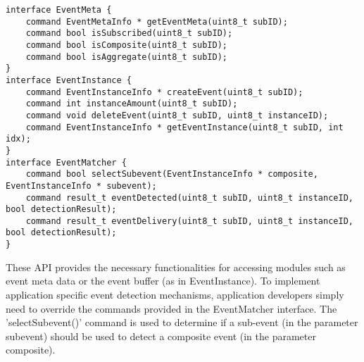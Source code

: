 \begin{lstlisting}[caption=API provided by PSWare, label=prog:pswareAPI]
interface EventMeta {
	command EventMetaInfo * getEventMeta(uint8_t subID);
	command bool isSubscribed(uint8_t subID);
	command bool isComposite(uint8_t subID);
	command bool isAggregate(uint8_t subID);
}
interface EventInstance {
	command EventInstanceInfo * createEvent(uint8_t subID);
	command int instanceAmount(uint8_t subID);
	command void deleteEvent(uint8_t subID, uint8_t instanceID);
	command EventInstanceInfo * getEventInstance(uint8_t subID, int idx);
}
interface EventMatcher {
	command bool selectSubevent(EventInstanceInfo * composite, EventInstanceInfo * subevent);
	command result_t eventDetected(uint8_t subID, uint8_t instanceID, bool detectionResult);
	command result_t eventDelivery(uint8_t subID, uint8_t instanceID, bool detectionResult);
}
\end{lstlisting}

These API provides the necessary functionalities for accessing modules such as event meta data or the event buffer (as in EventInstance). To implement application specific event detection mechanisms, application developers simply need to override the commands provided in the EventMatcher interface. The 'selectSubevent()' command is used to determine if a sub-event (in the parameter subevent) should be used to detect a composite event (in the parameter composite).